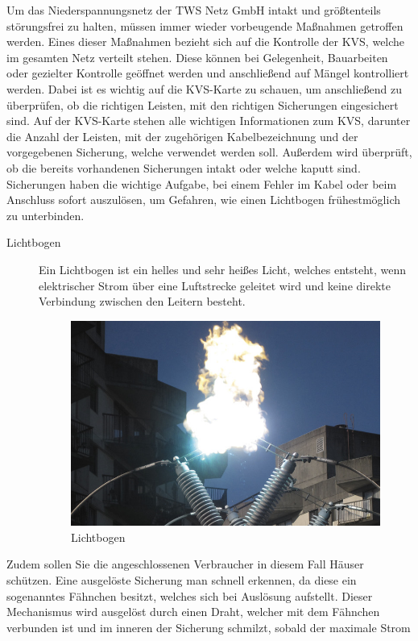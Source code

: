 Um das Niederspannungsnetz der TWS Netz GmbH intakt und größtenteils störungsfrei zu halten, müssen immer wieder vorbeugende Maßnahmen getroffen werden. 
Eines dieser Maßnahmen bezieht sich auf die Kontrolle der KVS, welche im gesamten Netz verteilt stehen. Diese können bei Gelegenheit, Bauarbeiten oder 
gezielter Kontrolle geöffnet werden und anschließend auf Mängel kontrolliert werden. Dabei ist es wichtig auf die KVS-Karte zu schauen, um anschließend zu 
überprüfen, ob die richtigen Leisten, mit den richtigen Sicherungen eingesichert sind. Auf der KVS-Karte stehen alle wichtigen Informationen zum KVS, darunter
die Anzahl der Leisten, mit der zugehörigen Kabelbezeichnung und der vorgegebenen Sicherung, welche verwendet werden soll.  Außerdem wird überprüft, ob die 
bereits vorhandenen Sicherungen intakt oder welche kaputt sind. Sicherungen haben die wichtige Aufgabe, bei einem Fehler im Kabel oder beim Anschluss sofort 
auszulösen, um Gefahren, wie einen Lichtbogen frühestmöglich zu unterbinden. 
\begin{description}
\item[Lichtbogen] Ein Lichtbogen ist ein helles und sehr heißes Licht, welches entsteht, wenn elektrischer Strom über eine Luftstrecke geleitet wird und 
keine direkte Verbindung zwischen den Leitern besteht.
\begin{figure}[hbt]
\centering
\includegraphics[width=0.87\linewidth]{images/Lichtbogen}
\caption[Lichtbogen]{Lichtbogen \autocite{Lichtbogen}}
\label{fig:Lichtbogen}
\end{figure}
\end{description}
Zudem sollen Sie die angeschlossenen Verbraucher in diesem Fall Häuser schützen. Eine ausgelöste Sicherung man schnell erkennen, da diese ein sogenanntes 
Fähnchen besitzt, welches sich bei Auslösung aufstellt. 
Dieser Mechanismus wird ausgelöst durch einen Draht, welcher mit dem Fähnchen verbunden ist und im inneren der Sicherung schmilzt, sobald der maximale Strom 
